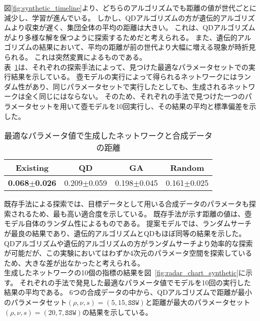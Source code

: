 \documentclass[uplatex,11pt,openany]{ujreport}
\begin{document}
            図\ref{fig:synthetic_timeline}より、どちらのアルゴリズムでも距離の値が世代ごとに減少し、学習が進んでいる。
            しかし、QDアルゴリズムの方が遺伝的アルゴリズムより収束が遅く、集団全体の平均の距離は大きい。
            これは、QDアルゴリズムがより多様な解を保つように探索するためだと考えられる。
            また、遺伝的アルゴリズムの結果において、平均の距離が前の世代より大幅に増える現象が時折見られる。
            これは突然変異によるものである。\\


            表~\ref{tab:best_synthetic_distance}は、それぞれの探索手法によって、見つけた最適なパラメータセットでの実行結果を示している。
            壺モデルの実行によって得られるネットワークにはランダム性があり、同じパラメータセットで実行したとしても、生成されるネットワークは全く同じにはならない。
            そのため、それぞれの手法で見つけた一つのパラメータセットを用いて壺モデルを10回実行し、その結果の平均と標準偏差を示した。

            \begin{table}[H]
                \centering
                \caption{最適なパラメータ値で生成したネットワークと合成データの距離}
                \label{tab:best_synthetic_distance}
                \begin{tabular}{cccc}
                \hline
                Existing    & QD          & GA          & Random      \\ \hline
                \textbf{0.068$\pm$0.026} & 0.209$\pm$0.059 & 0.198$\pm$0.045 & 0.161$\pm$0.025   \\   \hline
                \end{tabular}
            \end{table}

            既存手法による探索では、目標データとして用いる合成データのパラメータも探索されるため、最も高い適合度を示している。
            既存手法が示す距離の値は、壺モデル自体のランダム性によるものである。
            提案モデルでは、ランダムサーチが最良の結果であり、遺伝的アルゴリズムとQDもほぼ同等の結果を示した。
            QDアルゴリズムや遺伝的アルゴリズムの方がランダムサーチより効率的な探索が可能だが、この実験においてはわずか4次元のパラメータ空間を探索しているため、大きな差が出なかったと考えられる。\\


            生成したネットワークの10個の指標の結果を図~\ref{fig:radar_chart_synthetic}に示す。
            それぞれの手法で発見した最適なパラメータ値でモデルを10回の実行した結果の平均である。
            6つの合成データの中から、QDアルゴリズムで距離が最小のパラメータセット$(\rho, \nu, s) = (5, 15, \texttt{SSW})$と距離が最大のパラメータセット$(\rho, \nu, s) = (20, 7, \texttt{SSW})$の結果を示している。
\end{document}
